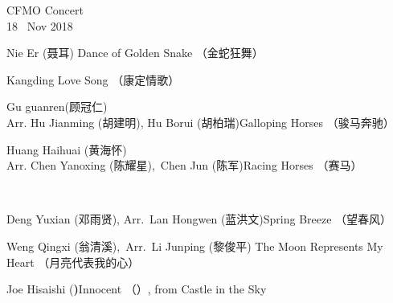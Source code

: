 \documentclass[letter,6pt,poets]{ConcProg}
\begin{document}
\begin{spacing}{1.1}
\begin{programme}{
    CFMO Concert
\\  {\normalsize 18 ~Nov 2018}
}
\begin{part}[]
    \begin{composition}{Nie Er (聂耳)} {}{Dance of Golden Snake  （金蛇狂舞）}{}
    \end{composition}
    \begin{composition}{}{}{Kangding Love Song  （康定情歌）}{}
    \end{composition}
    \begin{composition}{Gu guanren(顾冠仁)\\ Arr. Hu Jianming (胡建明), Hu Borui (胡柏瑞)}{}{Galloping Horses  （骏马奔驰）}{}
    \end{composition}
    \begin{composition}{Huang Haihuai (黄海怀)\\ Arr. Chen Yanoxing (陈耀星),\  Chen Jun (陈军)}{}{Racing Horses  （赛马）}{}
    \end{composition}\\
    \begin{composition}{Deng Yuxian (邓雨贤), Arr.\ Lan Hongwen (蓝洪文)}{}{Spring Breeze  （望春风）}{}
    \end{composition}
    \begin{composition}{Weng Qingxi (翁清溪),\ Arr.\ Li Junping (黎俊平) }{}{The Moon Represents My Heart  （月亮代表我的心）}{}
    \end{composition}
    \begin{composition}{Joe Hisaishi (\textbf{)}}{}{Innocent （）, from Castle in the Sky }{}
                   {}{}
    \end{composition}
    
    



\end{part}
\end{programme}
\end{spacing}
\end{document}
